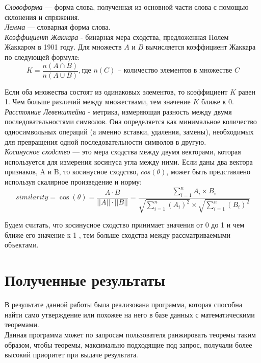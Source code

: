 \documentclass[12pt]{article}
\begin{document}
\textit{Словоформа} --- форма слова, полученная из основной части слова с помощью склонения и спряжения.\\

\textit{Лемма} --- словарная форма слова.\\

\textit{Коэффициент Жаккара} \cite{Jaccard} -  бинарная мера сходства, предложенная Полем Жаккаром в 1901 году. Для множеств $A$ и $B$ вычисляется коэффициент Жаккара по следующей формуле: $$K=\dfrac{n(A \cap B)}{n(A \cup B)}, \text{где } n(C) \text{ --  количество элементов в множестве } C$$

Если оба множества состоят из одинаковых элементов, то коэффициент $K$ равен 1. Чем больше различий между множествами, тем значение $K$ ближе к  $0$. \\

\textit{Расстояние Левенштейна}  - метрика, измеряющая разность между двумя последовательностями символов. Она определяется как минимальное количество односимвольных операций (а именно вставки, удаления, замены), необходимых для превращения одной последовательности символов в другую.\cite{Levenshtein} \\

\textit{Косинусное сходство} — это мера сходства между двумя векторами, которая используется для измерения косинуса угла между ними. Если даны два вектора признаков, A и B, то косинусное сходство, $cos(\theta)$, может быть представлено используя скалярное произведение и норму: 
$$similarity=\cos(\theta)=\dfrac{A \cdot B}{||A|| \cdot ||B||}=\dfrac{\sum \limits _{i=1}^{n} A_i \times B_i}{\sqrt{\sum \limits _{i=1}^{n} (A_i)^2} \times \sqrt{\sum \limits _{i=1}^{n} (B_i)^2}}$$

Будем считать, что косинусное сходство принимает значения от 0 до 1 и чем ближе его значение к 1 , тем больше сходства между рассматриваемыми объектами.

\newpage
\section{Полученные результаты}
В результате данной работы была реализована программа, которая способна найти само утверждение или похожее на него в базе данных с математическими теоремами. \\

Данная программа может по запросам пользователя ранжировать теоремы таким образом, чтобы теоремы, максимально подходящие под запрос, получали более высокий приоритет при выдаче результата. \\
\end{document}

